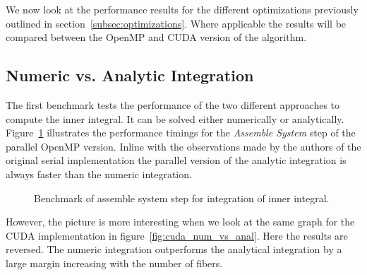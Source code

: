 \documentclass[a4paper,11pt]{kth-mag}
\begin{document}
We now look at the performance results for the different optimizations previously outlined in section~\ref{subsec:optimizations}. Where applicable the results will be compared between the OpenMP and CUDA version of the algorithm.

\subsection{Numeric vs. Analytic Integration}

The first benchmark tests the performance of the two different approaches to compute the inner integral. It can be solved either numerically or analytically. Figure~\ref{fig:openmp_num_vs_anal} illustrates the performance timings for the \emph{Assemble System} step of the parallel OpenMP version. Inline with the observations made by the authors of the original serial implementation the parallel version of the analytic integration is always faster than the numeric integration.

\begin{figure}
  \centering
  \caption{Benchmark of assemble system step for integration of inner integral.}
  \label{fig:openmp_num_vs_anal}
\end{figure}

However, the picture is more interesting when we look at the same graph for the CUDA implementation in figure~\ref{fig:cuda_num_vs_anal}. Here the results are reversed. The numeric integration outperforms the analytical integration by a large margin increasing with the number of fibers.
\end{document}
